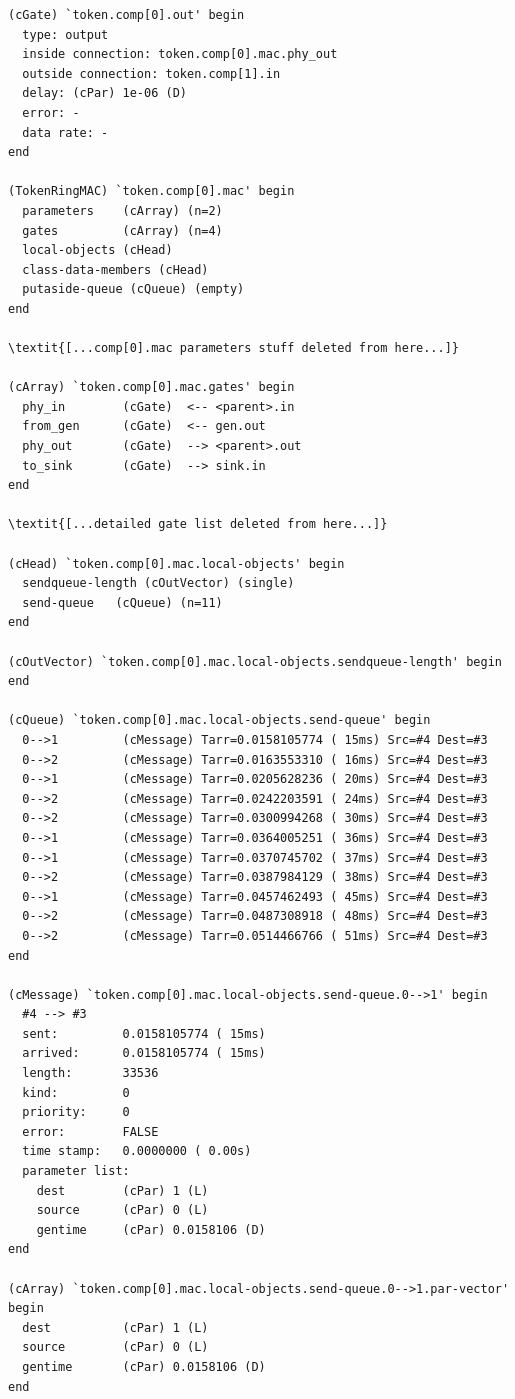 \begin{Verbatim}[commandchars=\\\{\}]
(cGate) `token.comp[0].out' begin
  type: output
  inside connection: token.comp[0].mac.phy_out
  outside connection: token.comp[1].in
  delay: (cPar) 1e-06 (D)
  error: -
  data rate: -
end

(TokenRingMAC) `token.comp[0].mac' begin
  parameters    (cArray) (n=2)
  gates         (cArray) (n=4)
  local-objects (cHead)
  class-data-members (cHead)
  putaside-queue (cQueue) (empty)
end

\textit{[...comp[0].mac parameters stuff deleted from here...]}

(cArray) `token.comp[0].mac.gates' begin
  phy_in        (cGate)  <-- <parent>.in
  from_gen      (cGate)  <-- gen.out
  phy_out       (cGate)  --> <parent>.out
  to_sink       (cGate)  --> sink.in
end

\textit{[...detailed gate list deleted from here...]}

(cHead) `token.comp[0].mac.local-objects' begin
  sendqueue-length (cOutVector) (single)
  send-queue   (cQueue) (n=11)
end

(cOutVector) `token.comp[0].mac.local-objects.sendqueue-length' begin
end

(cQueue) `token.comp[0].mac.local-objects.send-queue' begin
  0-->1         (cMessage) Tarr=0.0158105774 ( 15ms) Src=#4 Dest=#3
  0-->2         (cMessage) Tarr=0.0163553310 ( 16ms) Src=#4 Dest=#3
  0-->1         (cMessage) Tarr=0.0205628236 ( 20ms) Src=#4 Dest=#3
  0-->2         (cMessage) Tarr=0.0242203591 ( 24ms) Src=#4 Dest=#3
  0-->2         (cMessage) Tarr=0.0300994268 ( 30ms) Src=#4 Dest=#3
  0-->1         (cMessage) Tarr=0.0364005251 ( 36ms) Src=#4 Dest=#3
  0-->1         (cMessage) Tarr=0.0370745702 ( 37ms) Src=#4 Dest=#3
  0-->2         (cMessage) Tarr=0.0387984129 ( 38ms) Src=#4 Dest=#3
  0-->1         (cMessage) Tarr=0.0457462493 ( 45ms) Src=#4 Dest=#3
  0-->2         (cMessage) Tarr=0.0487308918 ( 48ms) Src=#4 Dest=#3
  0-->2         (cMessage) Tarr=0.0514466766 ( 51ms) Src=#4 Dest=#3
end

(cMessage) `token.comp[0].mac.local-objects.send-queue.0-->1' begin
  #4 --> #3
  sent:         0.0158105774 ( 15ms)
  arrived:      0.0158105774 ( 15ms)
  length:       33536
  kind:         0
  priority:     0
  error:        FALSE
  time stamp:   0.0000000 ( 0.00s)
  parameter list:
    dest        (cPar) 1 (L)
    source      (cPar) 0 (L)
    gentime     (cPar) 0.0158106 (D)
end

(cArray) `token.comp[0].mac.local-objects.send-queue.0-->1.par-vector' begin
  dest          (cPar) 1 (L)
  source        (cPar) 0 (L)
  gentime       (cPar) 0.0158106 (D)
end


\end{Verbatim}

